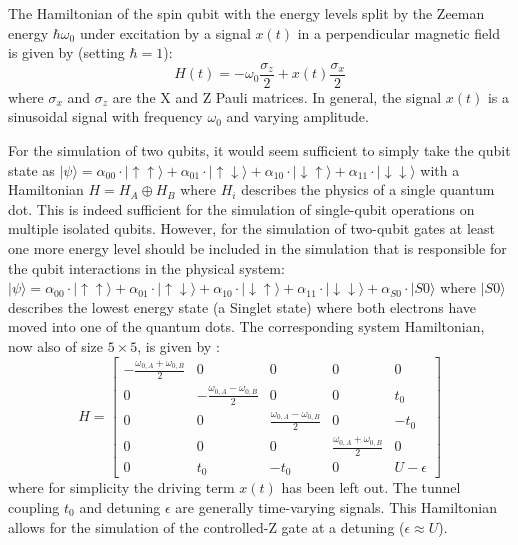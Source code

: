 \documentclass[10pt,a4paper,onecolumn,notitlepage]{article}
\begin{document}
The Hamiltonian of the spin qubit with the energy levels split by the Zeeman energy $\hbar \omega_0$ under excitation by a signal $x(t)$ in a perpendicular magnetic field is given by (setting $\hbar = 1$):
\begin{equation}
H(t) = -\omega_0 \frac{\sigma_z}{2} + x(t) \frac{\sigma_x}{2}
\end{equation}
where $\sigma_x$ and $\sigma_z$ are the X and Z Pauli matrices. In general, the signal $x(t)$ is a sinusoidal signal with frequency $\omega_0$ and varying amplitude.

For the simulation of two qubits, it would seem sufficient to simply take the qubit state as $|\psi\rangle = \alpha_{00} \cdot |\mathord{\uparrow\uparrow}\rangle + \alpha_{01} \cdot |\mathord{\uparrow\downarrow}\rangle + \alpha_{10} \cdot |\mathord{\downarrow\uparrow}\rangle + \alpha_{11} \cdot |\mathord{\downarrow\downarrow}\rangle$ with a Hamiltonian $H = H_A \oplus H_B$ where $H_i$ describes the physics of a single quantum dot. This is indeed sufficient for the simulation of single-qubit operations on multiple isolated qubits. However, for the simulation of two-qubit gates at least one more energy level should be included in the simulation that is responsible for the qubit interactions in the physical system:
$|\psi\rangle = \alpha_{00} \cdot |\mathord{\uparrow\uparrow}\rangle + \alpha_{01} \cdot |\mathord{\uparrow\downarrow}\rangle + \alpha_{10} \cdot |\mathord{\downarrow\uparrow}\rangle + \alpha_{11} \cdot |\mathord{\downarrow\downarrow}\rangle + \alpha_{S0} \cdot |\mathord{S0}\rangle$
where $|\mathord{S0}\rangle$ describes the lowest energy state (a Singlet state) where both electrons have moved into one of the quantum dots. The corresponding system Hamiltonian, now also of size $5 \times 5$, is given by \cite{veldhorst2015two}:
\begin{equation}
H = \begin{bmatrix}
-\frac{\omega_{0,A} + \omega_{0,B}}{2} & 0 & 0 & 0 & 0\\
0 & -\frac{\omega_{0,A} - \omega_{0,B}}{2} & 0 & 0 & t_0\\
0 & 0 & \frac{\omega_{0,A} - \omega_{0,B}}{2}  & 0 & -t_0\\
0 & 0 & 0 & \frac{\omega_{0,A} + \omega_{0,B}}{2}  & 0\\
0 & t_0 & -t_0 & 0 & U-\epsilon
\end{bmatrix}
\end{equation}
where for simplicity the driving term $x(t)$ has been left out. The tunnel coupling $t_0$ and detuning $\epsilon$ are generally time-varying signals. This Hamiltonian allows for the simulation of the controlled-Z gate at a detuning ($\epsilon \approx U$).
\end{document}

